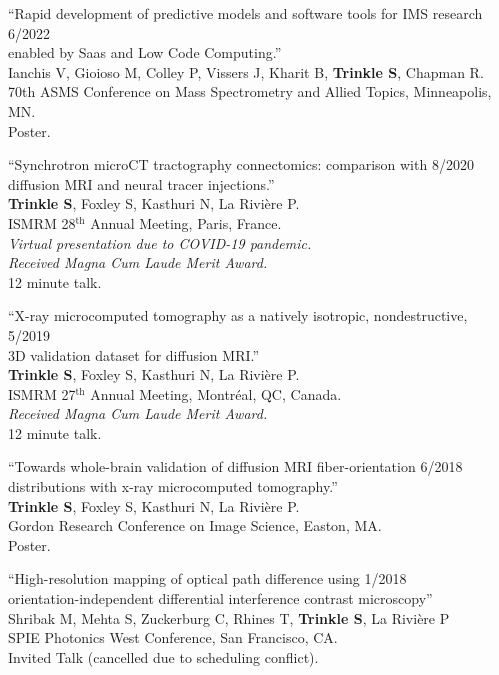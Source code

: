 \documentclass[10pt,letterpaper]{article}
\begin{document}
\begin{benumerate}{12}
\item{``Rapid development of predictive models and software tools for IMS research \hfill 6/2022\\ enabled by Saas and Low Code Computing.''\\
    Ianchis V, Gioioso M, Colley P, Vissers J, Kharit B, \textbf{Trinkle S}, Chapman R.\\
    70th ASMS Conference on Mass Spectrometry and Allied Topics, Minneapolis, MN.\\
    Poster.}
  
\item{``Synchrotron microCT tractography connectomics: comparison with \hfill 8/2020\\ diffusion MRI and neural tracer injections.''\\
    \textbf{Trinkle S}, Foxley S, Kasthuri N, La Rivière P.\\
    ISMRM 28$^{\text{th}}$ Annual Meeting, Paris, France.\\
    \textit{Virtual presentation due to COVID-19 pandemic.}\\
    \textit{Received Magna Cum Laude Merit Award.}\\
    12 minute talk.}

\item{``X-ray microcomputed tomography as a natively isotropic, nondestructive, \hfill 5/2019\\
    3D validation dataset for diffusion MRI.''\\
    \textbf{Trinkle S}, Foxley S, Kasthuri N, La Rivière P.\\
    ISMRM 27$^{\text{th}}$ Annual Meeting, Montr\'eal, QC, Canada.\\
    \textit{Received Magna Cum Laude Merit Award.}\\
    12 minute talk.}
  
\item{``Towards whole-brain validation of diffusion MRI fiber-orientation \hfill 6/2018\\
    distributions with x-ray microcomputed tomography.''\\
    \textbf{Trinkle S}, Foxley S, Kasthuri N, La Rivière P.\\
    Gordon Research Conference on Image Science, Easton, MA. \\
    Poster.}

\item{``High-resolution mapping of optical path difference using \hfill 1/2018\\
    orientation-independent differential interference contrast microscopy'' \\
    Shribak M, Mehta S, Zuckerburg C, Rhines T, \textbf{Trinkle S}, La Rivi\`ere P\\
    SPIE Photonics West Conference, San Francisco, CA. \\
    Invited Talk (cancelled due to scheduling conflict).}
  

\end{benumerate}
\end{document}
